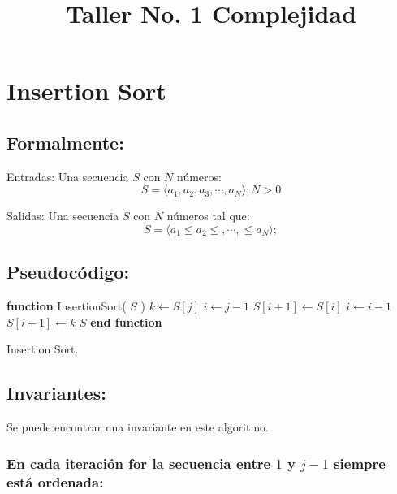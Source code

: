 \documentclass[12pt,spanish]{article}
\title{Taller No. 1 Complejidad}
\theoremstyle{definition}
\begin{document}

\section{Insertion Sort}{}

\subsection{Formalmente:}{}
Entradas: Una secuencia $S$ con $N$ números:
\begin{equation}
    S =  \left.\langle a_{1}, a_{2}, a_{3}, \cdots, a_{N} \rangle\right.;
    N > 0
\end{equation}

Salidas: Una secuencia $S$ con $N$ números tal que:
\begin{equation}
     S =  \left.\langle  a_{1} \le a_{2} \le, \cdots, \le a_{N} \rangle\right.;
\end{equation}

\subsection{Pseudocódigo:}{}
\begin{algorithm}
\begin{algorithmic}[1]
\STATE \textbf{function} InsertionSort( $S$ ) 
    \STATE $k \leftarrow S[j]$
    \STATE $i \leftarrow j - 1$
        \STATE $ S[i+1] \leftarrow S[i]$
        \STATE $ i \leftarrow i-1$
    \ENDWHILE
    \STATE $ S[i+1] \leftarrow k$
\ENDFOR
\RETURN $S$
\STATE \textbf{end function}
\caption{Insertion Sort.}
\end{algorithmic}
\end{algorithm}

\subsection{Invariantes:}{}
Se puede encontrar una invariante en este algoritmo.
\subsubsection{En cada iteración \textbf{for} la secuencia entre $1$ y $j-1$ siempre está ordenada:}{}
\end{document}
